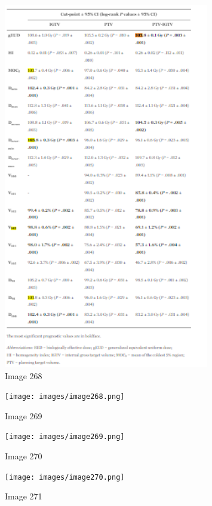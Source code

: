 \documentclass{article}%
\begin{document}
\begin{figure}[h!]%
\centering%
\includegraphics[width=0.8\textwidth]{images/image267.png}%
\caption{Image 268}%
\end{figure}

%


\begin{figure}[h!]%
\centering%
\texttt{[image: images/image268.png]}%
\caption{Image 269}%
\end{figure}

%


\begin{figure}[h!]%
\centering%
\texttt{[image: images/image269.png]}%
\caption{Image 270}%
\end{figure}

%


\begin{figure}[h!]%
\centering%
\texttt{[image: images/image270.png]}%
\caption{Image 271}%
\end{figure}
\end{document}
